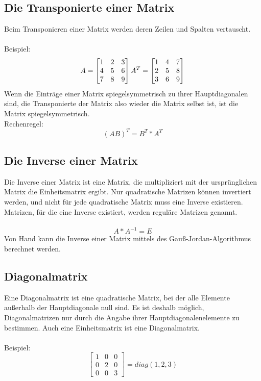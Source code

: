 \documentclass[11pt]{scrreprt}
\begin{document}
\subsection{Die Transponierte einer Matrix}
Beim Transponieren einer Matrix werden deren Zeilen und Spalten vertauscht.\\
\\
Beispiel:
\begin{equation}
A =
\begin{bmatrix}
1 & 2 & 3 \\
4 & 5 & 6 \\
7 & 8 & 9 
\end {bmatrix}\\
\\
\\
\\
A^T = 
\begin{bmatrix}
1 & 4 & 7 \\
2 & 5 & 8 \\
3 & 6 & 9 
\end {bmatrix}
\end{equation}
Wenn die Einträge einer Matrix spiegelsymmetrisch zu ihrer Hauptdiagonalen sind, die Transponierte der Matrix also wieder die Matrix selbst ist, ist die Matrix spiegelsymmetrisch.\\
Rechenregel:
\begin{equation}
(AB)^T =B^T * A^T
\end{equation}
\subsection{Die Inverse einer Matrix}
Die Inverse einer Matrix ist eine Matrix, die multipliziert mit der ursprünglichen Matrix die Einheitsmatrix ergibt. Nur quadratische Matrizen können invertiert werden, und nicht für jede quadratische Matrix muss eine Inverse existieren. Matrizen, für die eine Inverse existiert, werden reguläre Matrizen genannt.\\
\\
\begin{equation}
A * A^{-1} = E
\end{equation}
Von Hand kann die Inverse einer Matrix mittels des Gauß-Jordan-Algorithmus berechnet werden.
\subsection{Diagonalmatrix}
Eine Diagonalmatrix ist eine quadratische Matrix, bei der alle Elemente außerhalb der Hauptdiagonale null sind. Es ist deshalb möglich, Diagonalmatrizen nur durch die Angabe ihrer Hauptdiagonalenelemente zu bestimmen. Auch eine Einheitsmatrix ist eine Diagonalmatrix.\\
\\
Beispiel:
\begin{equation}
\begin{bmatrix}
1 & 0 & 0 \\
0 & 2 & 0 \\
0 & 0 & 3 
\end {bmatrix}
= diag(1,2,3)
\end{equation}
\end{document}

